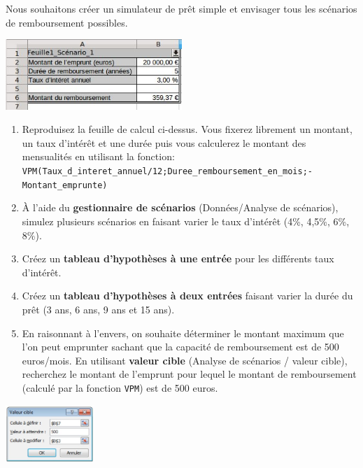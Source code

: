 \documentclass[a4paper]{article}
\begin{document}
\exost Nous souhaitons cr\'eer un simulateur de pr\^et simple et envisager tous les sc\'enarios de remboursement possibles.
\begin{center}
 \includegraphics[width=0.5\textwidth]{scenarios.jpg}
\end{center}
\begin{enumerate}
 \item Reproduisez la feuille de calcul ci-dessus. Vous fixerez librement un montant, un taux d'int\'er\^et et une dur\'ee 
 puis vous calculerez le montant des mensualit\'es en utilisant la fonction:\\
 \verb?VPM(Taux_d_interet_annuel/12;Duree_remboursement_en_mois;-Montant_emprunte)?
 \item \`A l'aide du \textbf{gestionnaire de sc\'enarios} (Donn\'ees/Analyse de sc\'enarios), simulez plusieurs sc\'enarios en faisant varier 
 le taux d'int\'er\^et (4\%, 4,5\%, 6\%, 8\%).
 \item Cr\'eez un \textbf{tableau d'hypoth\`eses \`a une entr\'ee} pour les diff\'erents taux d'int\'er\^et.
 \item Cr\'eez un \textbf{tableau d'hypoth\`eses \`a deux entr\'ees} faisant varier la dur\'ee du pr\^et (3 ans, 6 ans, 9 ans et 15 ans).
 \item En raisonnant \`a l'envers, on souhaite d\'eterminer le montant maximum que l'on peut emprunter sachant que
 la capacit\'e de remboursement est de 500 euros/mois. En utilisant \textbf{valeur cible} (Analyse de sc\'enarios / valeur cible),
 recherchez le montant de l'emprunt pour lequel le montant de remboursement (calcul\'e par la fonction \verb?VPM?) est de 500 euros.
\end{enumerate}

\begin{center}
 \includegraphics[width=0.25\textwidth]{valeur_cible.jpg}
\end{center}
\end{document}
